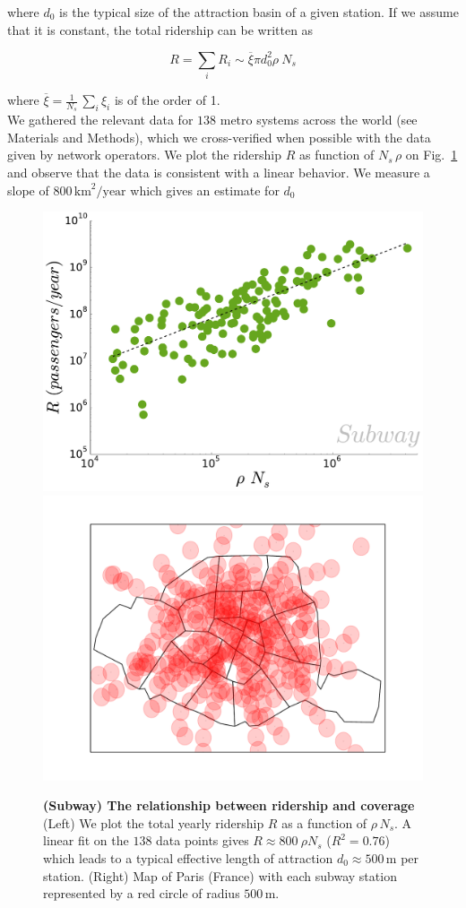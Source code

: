 where  $d_0$ is the typical size of the attraction basin of a given station. If we assume that it is constant, the total ridership can be written as

\begin{equation}
    R = \sum_i R_i \sim \overline{\xi} \pi d_0^2 \rho \: N_s
    \label{eq:ridership}
\end{equation}

where $\overline{\xi} = \frac{1}{N_s}\,\sum_i \xi_i$ is of the order of 1.\\

We gathered the relevant data for $138$ metro systems across the world (see
Materials and Methods), which we cross-verified when possible with the data
given by network operators. We plot the ridership $R$ as function of $N_s\,\rho$
on Fig.~\ref{fig:metro_ridership} and observe that the data is consistent with a
linear behavior. We measure a slope of $800\, \text{km}^2/\text{year}$ which
gives an estimate for $d_0$

\begin{figure}
\centering
    \includegraphics[width=.49\textwidth]{gfx/chapter-networks/metro_ridership_coverage.pdf}
    \includegraphics[width=.49\textwidth]{gfx/chapter-networks/paris_coverage.pdf}
    \caption{{\bf (Subway) The relationship between ridership and coverage} (Left)
    We plot the total yearly ridership $R$ as a function of $\rho\,N_s$. A linear
    fit on the $138$ data points gives $R \approx 800\:\rho N_s$ ($R^2=0.76$) which
    leads to a typical effective length of attraction $d_0 \approx 500\,\text{m}$
    per station. (Right) Map of Paris (France) with each subway station represented
    by a red circle of radius $500\,\text{m}$.\label{fig:metro_ridership}}
\end{figure}

